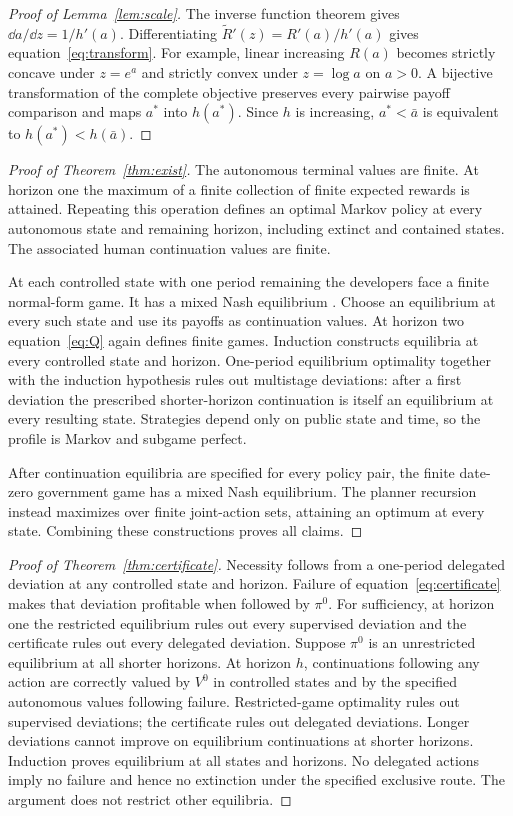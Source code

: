\begin{proof}[Proof of Lemma~\ref{lem:scale}]
The inverse function theorem gives $\dd a/\dd z=1/h'(a)$. Differentiating $\widetilde R'(z)=R'(a)/h'(a)$ gives equation~\eqref{eq:transform}. For example, linear increasing $R(a)$ becomes strictly concave under $z=e^a$ and strictly convex under $z=\log a$ on $a>0$. A bijective transformation of the complete objective preserves every pairwise payoff comparison and maps $a^*$ into $h(a^*)$. Since $h$ is increasing, $a^*<\bar a$ is equivalent to $h(a^*)<h(\bar a)$.
\end{proof}

\begin{proof}[Proof of Theorem~\ref{thm:exist}]
The autonomous terminal values are finite. At horizon one the maximum of a finite collection of finite expected rewards is attained. Repeating this operation defines an optimal Markov policy at every autonomous state and remaining horizon, including extinct and contained states. The associated human continuation values are finite.

At each controlled state with one period remaining the developers face a finite normal-form game. It has a mixed Nash equilibrium \citep{nash1951}. Choose an equilibrium at every such state and use its payoffs as continuation values. At horizon two equation~\eqref{eq:Q} again defines finite games. Induction constructs equilibria at every controlled state and horizon. One-period equilibrium optimality together with the induction hypothesis rules out multistage deviations: after a first deviation the prescribed shorter-horizon continuation is itself an equilibrium at every resulting state. Strategies depend only on public state and time, so the profile is Markov and subgame perfect.

After continuation equilibria are specified for every policy pair, the finite date-zero government game has a mixed Nash equilibrium. The planner recursion instead maximizes over finite joint-action sets, attaining an optimum at every state. Combining these constructions proves all claims.
\end{proof}

\begin{proof}[Proof of Theorem~\ref{thm:certificate}]
Necessity follows from a one-period delegated deviation at any controlled state and horizon. Failure of equation~\eqref{eq:certificate} makes that deviation profitable when followed by $\pi^0$. For sufficiency, at horizon one the restricted equilibrium rules out every supervised deviation and the certificate rules out every delegated deviation. Suppose $\pi^0$ is an unrestricted equilibrium at all shorter horizons. At horizon $h$, continuations following any action are correctly valued by $V^0$ in controlled states and by the specified autonomous values following failure. Restricted-game optimality rules out supervised deviations; the certificate rules out delegated deviations. Longer deviations cannot improve on equilibrium continuations at shorter horizons. Induction proves equilibrium at all states and horizons. No delegated actions imply no failure and hence no extinction under the specified exclusive route. The argument does not restrict other equilibria.
\end{proof}

